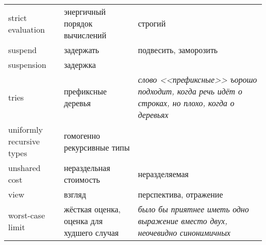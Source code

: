 \documentclass{article}
\begin{document}
\begin{tabular}{p{3cm}|p{4cm}|p{5cm}}
strict evaluation & энергичный порядок вычислений & строгий \\
suspend & задержать & подвесить, заморозить \\
suspension & задержка \\
tries & префиксные деревья & \textit{слово <<префиксные>> ъорошо
  подходит, когда речь идёт о строках, но плохо, когда о деревьях} \\
uniformly recursive types & гомогенно рекурсивные типы \\
unshared cost & нераздельная стоимость & неразделяемая \\
view & взгляд & перспектива, отражение \\
worst-case limit & жёсткая оценка, оценка для худшего случая &
\textit{было бы приятнее иметь одно выражение вместо двух, неочевидно
  синонимичных} \\

\end{tabular}
\end{document}
